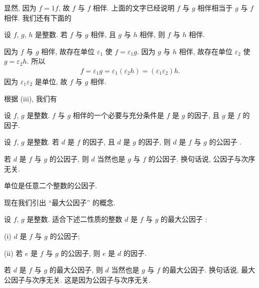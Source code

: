 显然, 因为 $f = 1f$, 故 $f$ 与 $f$ 相伴. 上面的文字已经说明 $f$ 与 $g$ 相伴相当于 $g$ 与 $f$ 相伴. 我们还有下面的
\begin{proposition}
    设 $f$, $g$, $h$ 是整数. 若 $f$ 与 $g$ 相伴, 且 $g$ 与 $h$ 相伴, 则 $f$ 与 $h$ 相伴.
\end{proposition}

\begin{pf}
    因为 $f$ 与 $g$ 相伴, 故存在单位 $\varepsilon_1$ 使 $f = \varepsilon_1 g$. 因为 $g$ 与 $h$ 相伴, 故存在单位 $\varepsilon_2$ 使 $g = \varepsilon_2 h$. 所以
    \begin{align*}
        f = \varepsilon_1 g = \varepsilon_1 (\varepsilon_2 h) = (\varepsilon_1 \varepsilon_2) h.
    \end{align*}
    因为 $\varepsilon_1 \varepsilon_2$ 是单位, 故 $f$ 与 $g$ 相伴.
\end{pf}

根据 (iii), 我们有
\begin{proposition}
    设 $f$, $g$ 是整数. $f$ 与 $g$ 相伴的一个必要与充分条件是 $f$ 是 $g$ 的因子, 且 $g$ 是 $f$ 的因子.
\end{proposition}

\begin{definition}
    设 $f$, $g$ 是整数. 若 $d$ 是 $f$ 的因子, 且 $d$ 是 $g$ 的因子, 则 $d$ 是 $f$ 与 $g$ 的公因子 .
\end{definition}

\begin{remark}
    若 $d$ 是 $f$ 与 $g$ 的公因子, 则 $d$ 当然也是 $g$ 与 $f$ 的公因子. 换句话说, 公因子与次序无关.
\end{remark}

\begin{example}
    单位是任意二个整数的公因子.
\end{example}

现在我们引出 ``最大公因子'' 的概念.

\begin{definition}
    设 $f$, $g$ 是整数. 适合下述二性质的整数 $d$ 是 $f$ 与 $g$ 的最大公因子 :

    (i) $d$ 是 $f$ 与 $g$ 的公因子;

    (ii) 若 $e$ 是 $f$ 与 $g$ 的公因子, 则 $e$ 是 $d$ 的因子.
\end{definition}

\begin{remark}
    若 $d$ 是 $f$ 与 $g$ 的最大公因子, 则 $d$ 当然也是 $g$ 与 $f$ 的最大公因子. 换句话说, 最大公因子与次序无关. 这是因为公因子与次序无关.
\end{remark}

